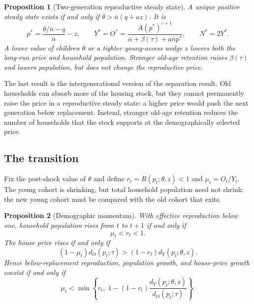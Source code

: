 \documentclass[11pt]{article}
\newtheorem{proposition}{Proposition}
\theoremstyle{definition}
\begin{document}
\begin{proposition}[Two-generation reproductive steady state]
\label{prop:two_cohort_ss}
A unique positive steady state exists if and only if
$\theta>\bar n(q+az)$. It is
\begin{equation}
 p^*=\frac{\theta/\bar n-q}{a}-z,
 \qquad
 Y^*=O^*=\frac{A(p^*)^{\varepsilon+1}}
 {\alpha+\beta(\tau)+a\bar n p^*},
 \qquad N^*=2Y^*.
 \label{eq:two_cohort_ss}
\end{equation}
A lower value of children $\theta$ or a tighter young-access wedge $z$ lowers
both the long-run price and household population. Stronger old-age retention
raises $\beta(\tau)$ and lowers population, but does not change the reproductive
price.
\end{proposition}

The last result is the intergenerational version of the separation result.
Old households can absorb more of the housing stock, but they cannot
permanently raise the price in a reproductive steady state: a higher price
would push the next generation below replacement. Instead, stronger old-age
retention reduces the number of households that the stock supports at the
demographically selected price.

\subsection*{The transition}

Fix the post-shock value of $\theta$ and define
$r_t=R(p_t;\theta,z)<1$ and $\mu_t=O_t/Y_t$. The young cohort is shrinking, but
total household population need not shrink: the new young cohort must be
compared with the old cohort that exits.

\begin{proposition}[Demographic momentum]
\label{prop:momentum}
With effective reproduction below one, household population rises from $t$ to
$t+1$ if and only if
\begin{equation}
 \mu_t<r_t<1.
 \label{eq:momentum_population}
\end{equation}
The house price rises if and only if
\begin{equation}
 (1-\mu_t)d_O(p_t;\tau)
 >(1-r_t)d_Y(p_t;\theta,z).
 \label{eq:momentum_price}
\end{equation}
Hence below-replacement reproduction, population growth, and house-price
growth coexist if and only if
\begin{equation}
 \mu_t<\min\left\{
 r_t,\;
 1-(1-r_t)\frac{d_Y(p_t;\theta,z)}{d_O(p_t;\tau)}
 \right\}.
 \label{eq:momentum_joint}
\end{equation}
\end{proposition}
\end{document}
